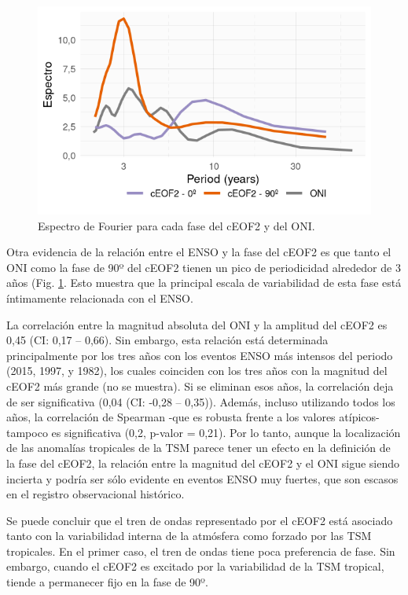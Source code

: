 \documentclass[12pt,oneside,a4paper]{reedthesis}
\begin{document}
\begin{figure}

{\centering \includegraphics{figures/20-ceofs/fft-ceof-era5-1} 

}

\caption{Espectro de Fourier para cada fase del cEOF2 y del ONI.}\label{fig:fft-ceof-era5}
\end{figure}



Otra evidencia de la relación entre el ENSO y la fase del cEOF2 es que tanto el ONI como la fase de 90º del cEOF2 tienen un pico de periodicidad alrededor de 3 años (Fig. \ref{fig:fft-ceof-era5}.
Esto muestra que la principal escala de variabilidad de esta fase está íntimamente relacionada con el ENSO.

La correlación entre la magnitud absoluta del ONI y la amplitud del cEOF2 es 0,45 (CI: 0,17 -- 0,66).
Sin embargo, esta relación está determinada principalmente por los tres años con los eventos ENSO más intensos del periodo (2015, 1997, y 1982), los cuales coinciden con los tres años con la magnitud del cEOF2 más grande (no se muestra).
Si se eliminan esos años, la correlación deja de ser significativa (0,04 (CI: -0,28 -- 0,35)).
Además, incluso utilizando todos los años, la correlación de Spearman -que es robusta frente a los valores atípicos- tampoco es significativa (0,2, p-valor = 0,21).
Por lo tanto, aunque la localización de las anomalías tropicales de la TSM parece tener un efecto en la definición de la fase del cEOF2, la relación entre la magnitud del cEOF2 y el ONI sigue siendo incierta y podría ser sólo evidente en eventos ENSO muy fuertes, que son escasos en el registro observacional histórico.

Se puede concluir que el tren de ondas representado por el cEOF2 está asociado tanto con la variabilidad interna de la atmósfera como forzado por las TSM tropicales.
En el primer caso, el tren de ondas tiene poca preferencia de fase.
Sin embargo, cuando el cEOF2 es excitado por la variabilidad de la TSM tropical, tiende a permanecer fijo en la fase de 90º.
\end{document}
